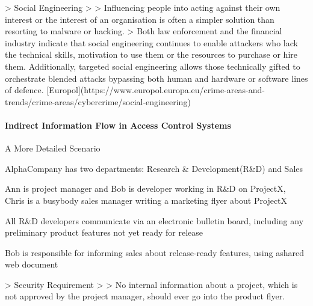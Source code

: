 \documentclass[a4paper]{article}
\begin{document}
\begin{multicols}{3}
    > Social Engineering
    >
    > Influencing people into acting against their own interest or the interest of an organisation is often a simpler solution than resorting to malware or hacking.
    > Both law enforcement and the financial industry indicate that social engineering continues to enable attackers who lack the technical skills, motivation to use them or the resources to purchase or hire them. Additionally, targeted social engineering allows those technically gifted to orchestrate blended attacks bypassing both human and hardware or software lines of defence. [Europol](https://www.europol.europa.eu/crime-areas-and-trends/crime-areas/cybercrime/social-engineering)


    \paragraph{Indirect Information Flow in Access Control Systems}
    A More Detailed Scenario
    \begin{itemize*}
        \item AlphaCompany has two departments: Research \& Development(R\&D) and Sales
        \item Ann is project manager and Bob is developer working in R\&D on ProjectX, Chris is a busybody sales manager writing a marketing flyer about ProjectX
        \item All R\&D developers communicate via an electronic bulletin board, including any preliminary product features not yet ready for release
        \item Bob is responsible for informing sales about release-ready features, using ashared web document
    \end{itemize*}
    > Security Requirement
    >
    > No internal information about a project, which is not approved by the project manager, should ever go into the product flyer.



\end{multicols}
\end{document}
